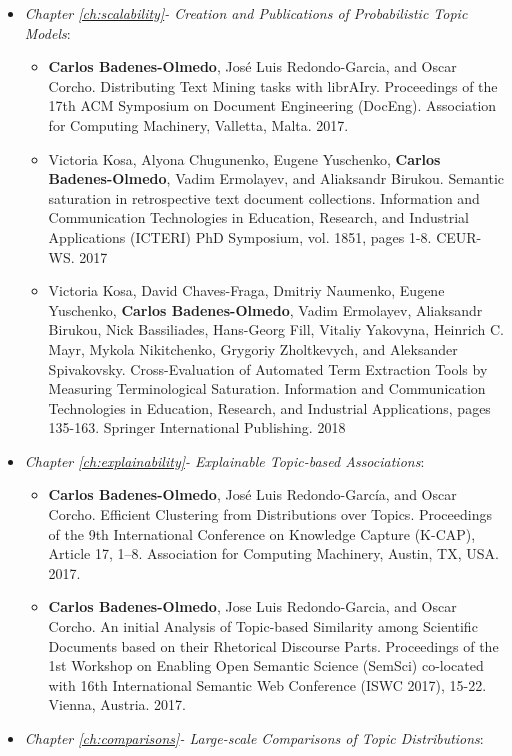 \begin{itemize}
\item \textit{Chapter \ref{ch:scalability}- Creation and Publications of Probabilistic Topic Models}:
\begin{itemize}
\item \textbf{Carlos Badenes-Olmedo}, José Luis Redondo-Garcia, and Oscar Corcho. Distributing Text Mining tasks with librAIry. Proceedings of the 17th ACM Symposium on Document Engineering (DocEng). Association for Computing Machinery, Valletta, Malta. 2017.
\item Victoria Kosa, Alyona Chugunenko, Eugene Yuschenko, \textbf{Carlos Badenes-Olmedo}, Vadim Ermolayev, and Aliaksandr Birukou. Semantic saturation in retrospective text document collections. Information and Communication Technologies in Education, Research, and Industrial Applications (ICTERI) PhD Symposium, vol. 1851, pages 1-8. CEUR-WS. 2017
\item Victoria Kosa, David Chaves-Fraga, Dmitriy Naumenko, Eugene Yuschenko, \textbf{Carlos Badenes-Olmedo}, Vadim Ermolayev, Aliaksandr Birukou, Nick Bassiliades, Hans-Georg Fill, Vitaliy Yakovyna, Heinrich C. Mayr, Mykola Nikitchenko, Grygoriy Zholtkevych, and Aleksander Spivakovsky. Cross-Evaluation of Automated Term Extraction Tools by Measuring Terminological Saturation. Information and Communication Technologies in Education, Research, and Industrial Applications, pages 135-163. Springer International Publishing. 2018
\end{itemize}
\item \textit{Chapter \ref{ch:explainability}- Explainable Topic-based Associations}:
\begin{itemize}
\item \textbf{Carlos Badenes-Olmedo}, José Luis Redondo-García, and Oscar Corcho. Efficient Clustering from Distributions over Topics. Proceedings of the 9th International Conference on Knowledge Capture (K-CAP), Article 17, 1–8. Association for Computing Machinery, Austin, TX, USA. 2017.
\item \textbf{Carlos Badenes-Olmedo}, Jose Luis Redondo-Garcia, and Oscar Corcho. An initial Analysis of Topic-based Similarity among Scientific Documents based on their Rhetorical Discourse Parts. Proceedings of the 1st Workshop on Enabling Open Semantic Science (SemSci) co-located with 16th International Semantic Web Conference (ISWC 2017), 15-22. Vienna, Austria. 2017.
\end{itemize}
\item \textit{Chapter \ref{ch:comparisons}- Large-scale Comparisons of Topic Distributions}:

\end{itemize}
